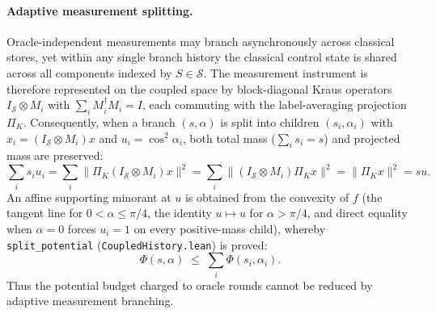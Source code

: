 \documentclass[11pt,a4paper]{article}
\theoremstyle{definition}
\theoremstyle{remark}
\begin{document}
\paragraph{Adaptive measurement splitting.}
Oracle-independent measurements may branch asynchronously across classical stores, yet within any single branch history the classical control state is shared across all components indexed by \(S \in \mathcal{S}\). The measurement instrument is therefore represented on the coupled space by block-diagonal Kraus operators \(I_{\mathcal{S}} \otimes M_i\) with \(\sum_i M_i^\dagger M_i = I\), each commuting with the label-averaging projection \(\Pi_K\). Consequently, when a branch \((s, \alpha)\) is split into children \((s_i, \alpha_i)\) with \(x_i = (I_{\mathcal{S}} \otimes M_i)x\) and \(u_i = \cos^2\alpha_i\), both total mass (\(\sum_i s_i = s\)) and projected mass are preserved:
\[
  \sum_i s_i u_i
  = \sum_i \bigl\|\Pi_K (I_{\mathcal{S}} \otimes M_i) x\bigr\|^2
  = \sum_i \bigl\|(I_{\mathcal{S}} \otimes M_i) \Pi_K x\bigr\|^2
  = \|\Pi_K x\|^2
  = s u.
\]
An affine supporting minorant at \(u\) is obtained from the convexity of \(f\) (the tangent line for \(0 < \alpha \le \pi/4\), the identity \(u \mapsto u\) for \(\alpha > \pi/4\), and direct equality when \(\alpha = 0\) forces \(u_i = 1\) on every positive-mass child), whereby \texttt{split\_potential} (\texttt{CoupledHistory.lean}) is proved:
\[
  \Phi(s, \alpha) \;\le\; \sum_i \Phi(s_i, \alpha_i).
\]
Thus the potential budget charged to oracle rounds cannot be reduced by adaptive measurement branching.
\end{document}

